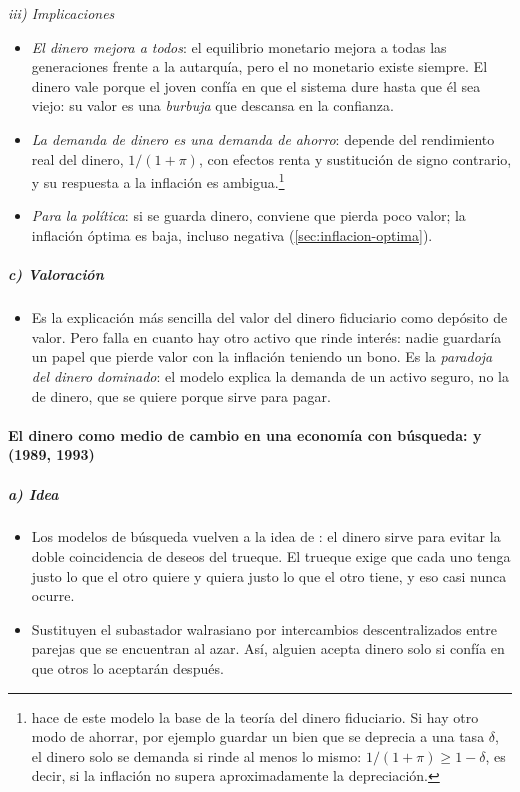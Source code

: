 \documentclass[11pt]{article}
\begin{document}
\hspace*{3.6em}\emph{iii) Implicaciones}

\begin{itemize}
\item \emph{El dinero mejora a todos}: el equilibrio monetario mejora a todas las generaciones frente a la autarquía, pero el no monetario existe siempre. El dinero vale porque el joven confía en que el sistema dure hasta que él sea viejo: su valor es una \emph{burbuja} que descansa en la confianza.
\item \emph{La demanda de dinero es una demanda de ahorro}: depende del rendimiento real del dinero, $1/(1+\pi)$, con efectos renta y sustitución de signo contrario, y su respuesta a la inflación es ambigua\nocite{BlanchardFischer1989Lectures}.\footnote{\textcite{Wallace1980Overlapping} hace de este modelo la base de la teoría del dinero fiduciario. Si hay otro modo de ahorrar, por ejemplo guardar un bien que se deprecia a una tasa $\delta$, el dinero solo se demanda si rinde al menos lo mismo: $1/(1+\pi)\geq 1-\delta$, es decir, si la inflación no supera aproximadamente la depreciación\nocite{BlanchardFischer1989Lectures}.}
\item \emph{Para la política}: si se guarda dinero, conviene que pierda poco valor; la inflación óptima es baja, incluso negativa (\ref{sec:inflacion-optima}).
\end{itemize}

\subparagraph{c) Valoración}

\begin{itemize}
\item Es la explicación más sencilla del valor del dinero fiduciario como depósito de valor. Pero falla en cuanto hay otro activo que rinde interés: nadie guardaría un papel que pierde valor con la inflación teniendo un bono. Es la \emph{paradoja del dinero dominado}: el modelo explica la demanda de un activo seguro, no la de dinero, que se quiere porque sirve para pagar.
\end{itemize}

\paragraph{El dinero como medio de cambio en una economía con búsqueda:\cortetitulo{}  y  (1989, 1993)}

\subparagraph{a) Idea}

\begin{itemize}
\item Los modelos de búsqueda vuelven a la idea de : el dinero sirve para evitar la doble coincidencia de deseos del trueque. El trueque exige que cada uno tenga justo lo que el otro quiere y quiera justo lo que el otro tiene, y eso casi nunca ocurre.
\item Sustituyen el subastador walrasiano por intercambios descentralizados entre parejas que se encuentran al azar\nocite{KiyotakiWright1989Money,KiyotakiWright1993Search}. Así, alguien acepta dinero solo si confía en que otros lo aceptarán después.
\end{itemize}
\end{document}
